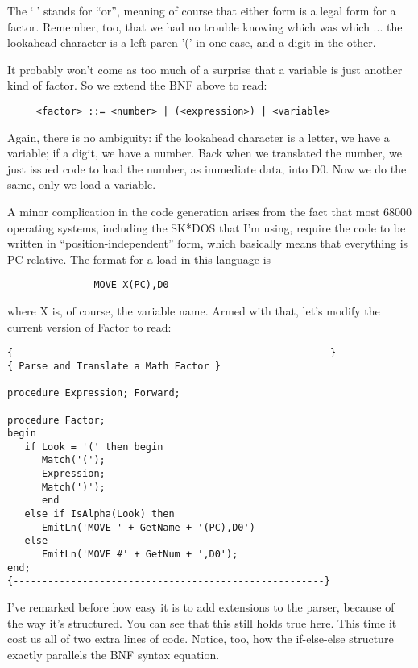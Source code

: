 The `|' stands for ``or'', meaning of course that either form  is a legal form for a factor. Remember, too, that we had no trouble knowing which was which  ... the  lookahead  character is a left paren '(' in one case, and a digit in the other.

It probably won't come as too much of a surprise that  a variable is just another kind of factor. So  we extend the BNF above to read:

\begin{verbatim}
     <factor> ::= <number> | (<expression>) | <variable>
\end{verbatim}

Again, there is no  ambiguity:  if  the  lookahead character is a letter, we  have  a variable; if a digit, we have a number. Back when we translated the number, we just issued code  to  load  the number, as immediate data, into D0. Now we do the same, only we load a variable.

A minor complication in the  code generation arises from the fact that most  68000 operating systems, including the SK*DOS that I'm using, require the code to be  written  in ``position-independent'' form, which  basically means that everything is PC-relative. The format for a load in this language is

\begin{verbatim}
               MOVE X(PC),D0
\end{verbatim}

where X is, of course, the variable name. Armed with that, let's modify the current version of Factor to read:

\begin{verbatim}
{-------------------------------------------------------}
{ Parse and Translate a Math Factor }

procedure Expression; Forward;

procedure Factor;
begin
   if Look = '(' then begin
      Match('(');
      Expression;
      Match(')');
      end
   else if IsAlpha(Look) then
      EmitLn('MOVE ' + GetName + '(PC),D0')
   else
      EmitLn('MOVE #' + GetNum + ',D0');
end;
{------------------------------------------------------}
\end{verbatim}

I've  remarked before how easy it is to  add  extensions  to  the parser, because of  the  way  it's  structured. You can see that this  still  holds true here. This time it cost us  all  of  two extra lines of code. Notice, too, how the if-else-else structure exactly parallels the BNF syntax equation.

